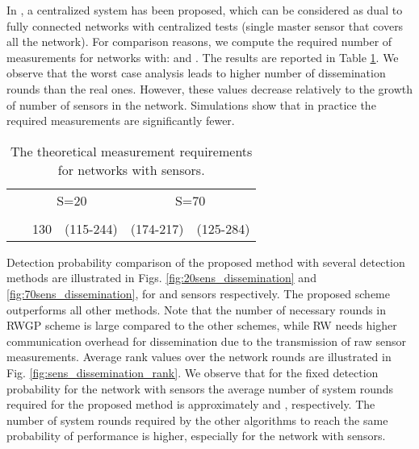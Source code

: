 \documentclass[journal]{IEEEtran}
\begin{document}
In \cite{Cheraghchi:11}, a centralized system has been proposed, which can be considered as dual to fully connected networks with centralized tests (single master sensor that covers all the network). For comparison reasons, we compute the required number of measurements for networks with:  and . The results are reported in Table \ref{tab:theory_requir}. We observe that the worst case analysis leads to higher number of dissemination rounds than the real ones. However, these values decrease relatively to the growth of number of sensors in the network. Simulations show that in practice the required measurements are significantly fewer.
\begin{table}
\begin{center}
\caption{The theoretical measurement requirements for networks with  sensors.}
\begin{tabular}{|c|c|c|c|c|}
\hline
&\multicolumn{2}{|c|}{S=20} &\multicolumn{2}{|c|}{S=70}\\
&&&&\\
\hline
&~130  & (115-244)& (174-217)&(125-284)\\
\hline
\end{tabular}\label{tab:theory_requir}
\end{center}
\end{table}


Detection probability comparison of the proposed method with several detection methods are illustrated in Figs. \ref{fig:20sens_dissemination} and \ref{fig:70sens_dissemination}, for  and  sensors respectively. The proposed scheme outperforms all other methods. Note that the number of necessary rounds in RWGP scheme is large compared to the other schemes, while RW needs higher communication overhead for dissemination due to the transmission of raw sensor measurements. Average rank values over the network rounds are illustrated in Fig. \ref{fig:sens_dissemination_rank}.
We observe that for the fixed detection probability  for the network with  sensors the average number of system rounds required for the proposed method is approximately  and , respectively. The number of system rounds required by the other algorithms to reach the same probability of performance is higher, especially for the network with  sensors. 
\end{document}
